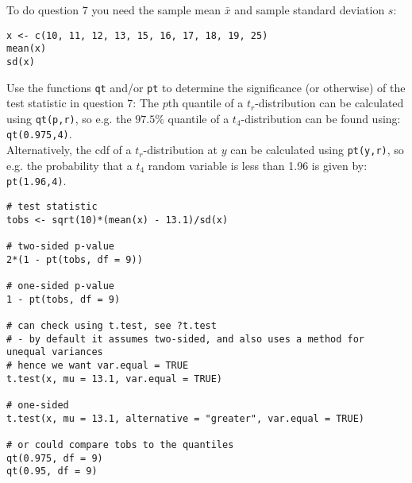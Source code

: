 \documentclass[answers]{exam}
\begin{document}
\begin{questions}
\question%
To do question 7 you need the sample mean $\bar{x}$ and sample standard deviation $s$: \begin{verbatim}
x <- c(10, 11, 12, 13, 15, 16, 17, 18, 19, 25)
mean(x)
sd(x)
\end{verbatim} Use the functions \verb|qt| and/or \verb|pt| to determine the significance (or otherwise) of the test statistic in question 7: The $p$th quantile of a $t_{r}$-distribution can be calculated using \verb|qt(p,r)|, so e.g. the $97.5 \%$ quantile of a $t_{4}$-distribution can be found using: \verb|qt(0.975,4)|.\\ Alternatively, the cdf of a $t_{r}$-distribution at $y$ can be calculated using \verb|pt(y,r)|, so e.g. the probability that a $t_{4}$ random variable is less than 1.96 is given by: \verb|pt(1.96,4)|. \begin{verbatim}
# test statistic
tobs <- sqrt(10)*(mean(x) - 13.1)/sd(x)

# two-sided p-value
2*(1 - pt(tobs, df = 9))

# one-sided p-value
1 - pt(tobs, df = 9)

# can check using t.test, see ?t.test
# - by default it assumes two-sided, and also uses a method for unequal variances
# hence we want var.equal = TRUE
t.test(x, mu = 13.1, var.equal = TRUE)

# one-sided
t.test(x, mu = 13.1, alternative = "greater", var.equal = TRUE)

# or could compare tobs to the quantiles
qt(0.975, df = 9)
qt(0.95, df = 9)
\end{verbatim}

\end{questions}
\end{document}
